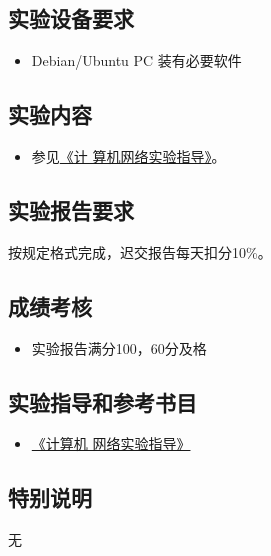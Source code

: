 \documentclass{wx672article}
\begin{document}
\subsection{实验设备要求}
\label{sec-3-3}

\begin{itemize}
\item Debian/Ubuntu PC 装有必要软件
\end{itemize}

\subsection{实验内容}
\label{sec-3-4}

\begin{itemize}
\item 参见\href{http://cs2.swfu.edu.cn/~wx672/lecture_notes/network_basics/net-tools/}{《计
    算机网络实验指导》}。
\end{itemize}

\subsection{实验报告要求}
\label{sec-3-5}

按规定格式完成，迟交报告每天扣分10\%。

\subsection{成绩考核}
\label{sec-3-6}

\begin{itemize}
\item 实验报告满分100，60分及格
\end{itemize}

\subsection{实验指导和参考书目}
\label{sec-3-7}

\begin{itemize}
\item \href{http://cs2.swfu.edu.cn/~wx672/lecture_notes/network_basics/net-tools/}{《计算机
    网络实验指导》}
\end{itemize}

\subsection{特别说明}
\label{sec-3-8}

无
\end{document}
